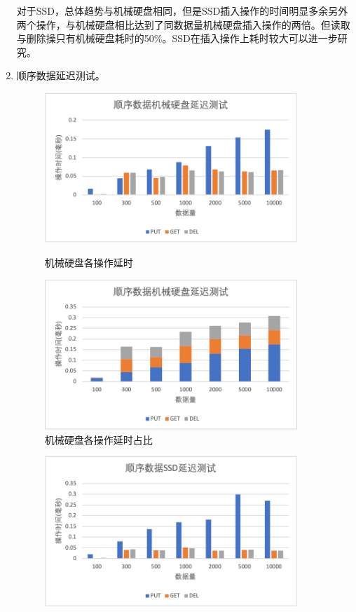 \documentclass[fontset=windows]{article}
\begin{document}
\begin{enumerate}
对于SSD，总体趋势与机械硬盘相同，但是SSD插入操作的时间明显多余另外两个操作，与机械硬盘相比达到了同数据量机械硬盘插入操作的两倍。但读取与删除操只有机械硬盘耗时的50\%。SSD在插入操作上耗时较大可以进一步研究。
\item 顺序数据延迟测试。
\begin{figure}[H]
\begin{minipage}[t]{0.5\linewidth}   
    \centering   
    \includegraphics[width=0.9\textwidth]{img/sequential_latency_three.png}   
    \caption{机械硬盘各操作延时}   
    \label{fig:s_l_t}
\end{minipage}
\begin{minipage}[t]{0.5\linewidth} %
    \centering
    \includegraphics[width=0.9\textwidth]{img/sequential_latency_one.png}
    \caption{机械硬盘各操作延时占比}
    \label{fig:s_l_o}
\end{minipage} 
\end{figure}
\begin{figure}[H]
   \begin{minipage}[t]{0.5\linewidth}   
     \centering   
     \includegraphics[width=0.9\textwidth]{img/sequential_SSD_latency_three.png}   

\end{minipage}
\end{figure}
\end{enumerate}
\end{document}
